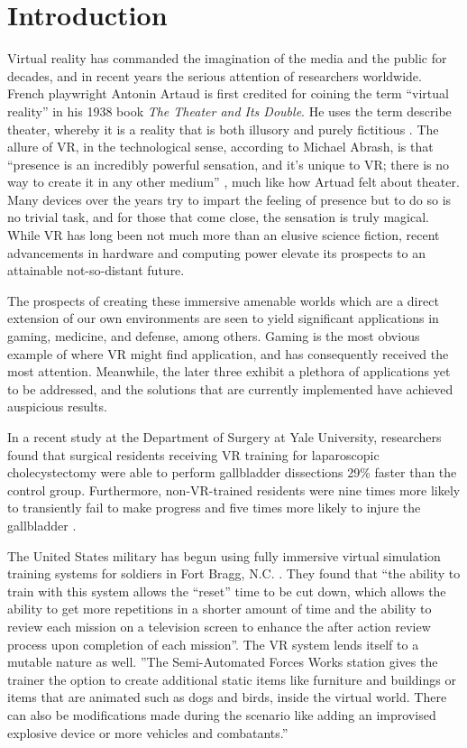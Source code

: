 \section{Introduction}
\label{sec:introduction}

Virtual reality has commanded the imagination of the media and the public for
decades, and in recent years the serious attention of researchers worldwide.
French playwright Antonin Artaud is first credited for coining the term
``virtual reality'' in his 1938 book \emph{The Theater and Its Double}. He uses
the term describe theater, whereby it is a reality that is both illusory and
purely fictitious \cite{website:popularizeVR}. The allure of VR, in the
technological sense, according to Michael Abrash, is that ``presence is an
incredibly powerful sensation, and it's unique to VR; there is no way to create
it in any other medium'' \cite{website:steampowered}, much like how Artuad felt
about theater. Many devices over the years try to impart the feeling of
presence but to do so is no trivial task, and for those that come close, the
sensation is truly magical. While VR has long been not much more than an
elusive science fiction, recent advancements in hardware and computing power
elevate its prospects to an attainable not-so-distant future. 

The prospects of creating these immersive amenable worlds which are a direct
extension of our own environments are seen to yield significant applications in
gaming, medicine, and defense, among others. Gaming is the most obvious example
of where VR might find application, and has consequently received the most
attention. Meanwhile, the later three exhibit a plethora of applications yet to
be addressed, and the solutions that are currently implemented have achieved
auspicious results. 

In a recent study at the Department of Surgery at Yale University, researchers
found that surgical residents receiving VR training for laparoscopic
cholecystectomy were able to perform gallbladder dissections 29\% faster than
the control group. Furthermore, non-VR-trained residents were nine times more
likely to transiently fail to make progress and five times more likely to
injure the gallbladder \cite{seymour2002virtual}.

The United States military has begun using fully immersive virtual simulation
training systems for soldiers in Fort Bragg, N.C. \cite{website:army}. They
found that ``the ability to train with this system allows the ``reset'' time to
be cut down, which allows the ability to get more repetitions in a shorter
amount of time and the ability to review each mission on a television screen to
enhance the after action review process upon completion of each mission''.  The
VR system lends itself to a mutable nature as well. ''The Semi-Automated Forces
Works station gives the trainer the option to create additional static items
like furniture and buildings or items that are animated such as dogs and birds,
inside the virtual world. There can also be modifications made during the
scenario like adding an improvised explosive device or more vehicles and
combatants.''

